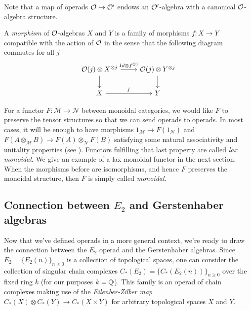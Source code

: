 \documentclass[TFM.tex]{subfiles}
\begin{document}
Note that a map of operads ${\mathcal O}\to {\mathcal O}'$ endows an ${\mathcal O}'$-algebra with a canonical ${\mathcal O}$-algebra structure.

\begin{defi}
	A \emph{morphism} of ${\mathcal O}$-algebras $X$ and $Y$ is a family of morphisms $f:X\to Y$ compatible with the action of ${\mathcal O}$ in the sense that the following diagram commutes for all $j$
	\[
	\begin{tikzcd}
	\OO(j)\otimes X^{\otimes j}\arrow[r, "Id\otimes f^{\otimes j}"]\arrow[d] & 	\OO(j)\otimes Y^{\otimes j}\arrow[d]\\
	X\arrow[r, "f"] & Y
	\end{tikzcd}
	\]
	\end{defi}


For a functor $F:\mathscr{M}\to\mathscr{N}$ between monoidal categories, we would like $F$ to preserve the tensor structures so that we can send operads to operads. In most cases, it will be enough to have  morphisms $1_{\mathscr{M}}\to F(1_\mathscr{N})$ and $F(A\otimes_{\mathscr{M}}B)\to F(A)\otimes_{\mathscr{N}} F(B)$ satisfying some natural associativity and unitality properties (see \cite[Definition 6.4.1]{handbook}). Functors fulfilling that last property are called \emph{lax monoidal}. We give an example of a lax monoidal functor in the next section. When the morphisms before are isomorphisms, and hence $F$ preserves the monoidal structure, then $F$ is simply called \emph{monoidal}.

\subsection{Connection between $E_2$ and Gerstenhaber algebras}\label{zilber}

Now that we've defined operads in a more general context, we're ready to draw the connection between the $E_2$ operad and the Gerstenhaber algebras. Since $E_2=\{E_2(n)\}_{n\geq 0}$ is a collection of topological spaces, one can consider the collection of singular chain complexes $C_*(E_2)=\{C_*(E_2(n))\}_{n\geq 0}$ over the fixed ring $k$ (for our purposes $k=\mathbb{Q}$). This family is an operad of chain complexes making use of the \emph{Eilenber-Zilber map} \cite{EZ} $C_*(X)\otimes C_*(Y)\to C_*(X\times Y)$ for arbitrary topological spaces $X$ and $Y$. 
\end{document}
